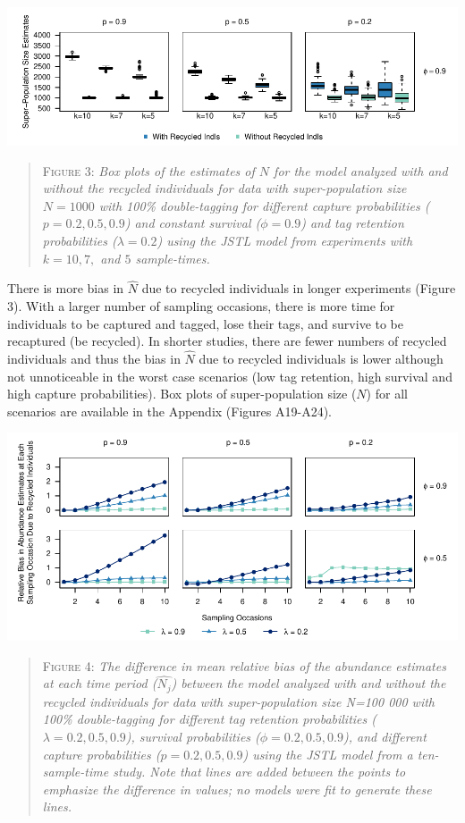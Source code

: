 \documentclass[]{article}
\begin{document}
\includegraphics{RecycledPaper_files/figure-latex/Figure3_N_k-1.pdf}

\begin{quote}
\textsc{Figure 3:}
\textsl{Box plots of the estimates of $N$ for the model analyzed with and without the recycled individuals for data with super-population size $N=1000$ with 100\% double-tagging for different capture probabilities ($p=0.2,0.5,0.9$) and constant survival ($\phi=0.9$) and tag retention probabilities ($\lambda=0.2$) using the JSTL model from experiments with $k=10, 7,$ and $5$ sample-times. }
\end{quote}

There is more bias in \(\hat{N}\) due to recycled individuals in longer
experiments (Figure 3). With a larger number of sampling occasions,
there is more time for individuals to be captured and tagged, lose their
tags, and survive to be recaptured (be recycled). In shorter studies,
there are fewer numbers of recycled individuals and thus the bias in
\(\hat{N}\) due to recycled individuals is lower although not
unnoticeable in the worst case scenarios (low tag retention, high
survival and high capture probabilities). Box plots of super-population
size (\(N\)) for all scenarios are available in the Appendix (Figures
A19-A24).

\includegraphics{RecycledPaper_files/figure-latex/Figure4_N_j-1.pdf}

\begin{quote}
\textsc{Figure 4:}
\textsl{The difference in mean relative bias of the abundance estimates at each time period ($\hat{N_j}$) between the model analyzed with and without the recycled individuals for data with super-population size N=100 000 with 100\% double-tagging for different tag retention probabilities ($\lambda=0.2,0.5,0.9$), survival probabilities ($\phi=0.2,0.5,0.9$), and different capture probabilities ($p=0.2,0.5,0.9$) using the JSTL model from a ten-sample-time study.  Note that lines are added between the points to emphasize the difference in values; no models were fit to generate these lines.}
\end{quote}
\end{document}
